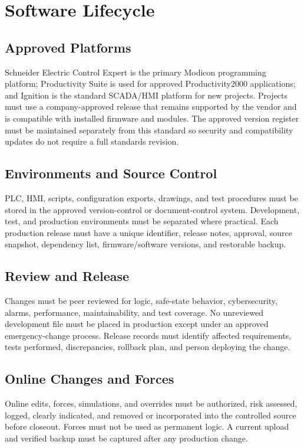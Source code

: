 \chapter{Software Lifecycle}
\section{Approved Platforms}
Schneider Electric Control Expert is the primary Modicon programming platform; Productivity Suite is used for approved Productivity2000 applications; and Ignition is the standard SCADA/HMI platform for new projects. Projects must use a company-approved release that remains supported by the vendor and is compatible with installed firmware and modules. The approved version register must be maintained separately from this standard so security and compatibility updates do not require a full standards revision.

\section{Environments and Source Control}
PLC, HMI, scripts, configuration exports, drawings, and test procedures must be stored in the approved version-control or document-control system. Development, test, and production environments must be separated where practical. Each production release must have a unique identifier, release notes, approval, source snapshot, dependency list, firmware/software versions, and restorable backup.

\section{Review and Release}
Changes must be peer reviewed for logic, safe-state behavior, cybersecurity, alarms, performance, maintainability, and test coverage. No unreviewed development file must be placed in production except under an approved emergency-change process. Release records must identify affected requirements, tests performed, discrepancies, rollback plan, and person deploying the change.

\section{Online Changes and Forces}
Online edits, forces, simulations, and overrides must be authorized, risk assessed, logged, clearly indicated, and removed or incorporated into the controlled source before closeout. Forces must not be used as permanent logic. A current upload and verified backup must be captured after any production change.

